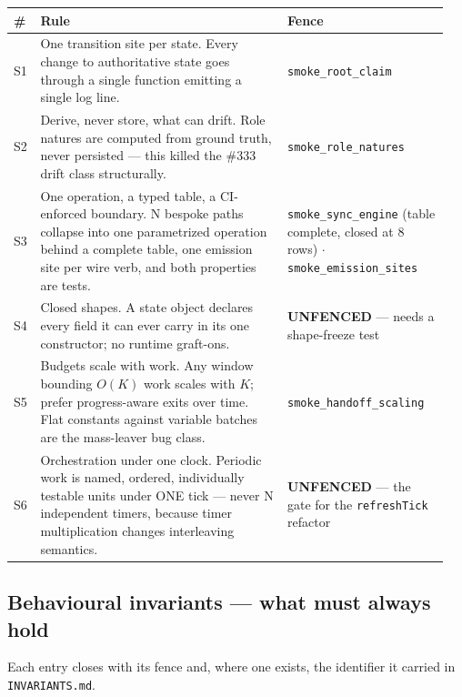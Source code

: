 \documentclass[nobib]{tufte-handout}
\begin{document}
\vspace{0.4em}
\begin{fullwidth}
\scriptsize
\begin{tabular}{@{}p{0.04\linewidth}>{\raggedright\arraybackslash}p{0.55\linewidth}>{\raggedright\arraybackslash}p{0.36\linewidth}@{}}
\toprule
\textbf{\#} & \textbf{Rule} & \textbf{Fence} \\
\midrule
S1 & One transition site per state. Every change to authoritative state
     goes through a single function emitting a single log line. &
     \texttt{smoke\_root\_claim} \\
S2 & Derive, never store, what can drift. Role natures are computed from
     ground truth, never persisted --- this killed the \#333 drift class
     structurally. & \texttt{smoke\_role\_natures} \\
S3 & One operation, a typed table, a CI-enforced boundary. N bespoke
     paths collapse into one parametrized operation behind a complete
     table, one emission site per wire verb, and both properties are
     tests. & \texttt{smoke\_sync\_engine} (table complete, closed at 8
     rows) $\cdot$ \texttt{smoke\_emission\_sites} \\
S4 & Closed shapes. A state object declares every field it can ever
     carry in its one constructor; no runtime graft-ons. &
     \textbf{UNFENCED} --- needs a shape-freeze test \\
S5 & Budgets scale with work. Any window bounding $O(K)$ work scales
     with $K$; prefer progress-aware exits over time. Flat constants
     against variable batches are the mass-leaver bug class. &
     \texttt{smoke\_handoff\_scaling} \\
S6 & Orchestration under one clock. Periodic work is named, ordered,
     individually testable units under ONE tick --- never N independent
     timers, because timer multiplication changes interleaving
     semantics. & \textbf{UNFENCED} --- the gate for the
     \texttt{refreshTick} refactor \\
\bottomrule
\end{tabular}
\end{fullwidth}

\subsection{Behavioural invariants --- what must always hold}

Each entry closes with its fence and, where one exists, the identifier
it carried in \texttt{INVARIANTS.md}.
\end{document}
